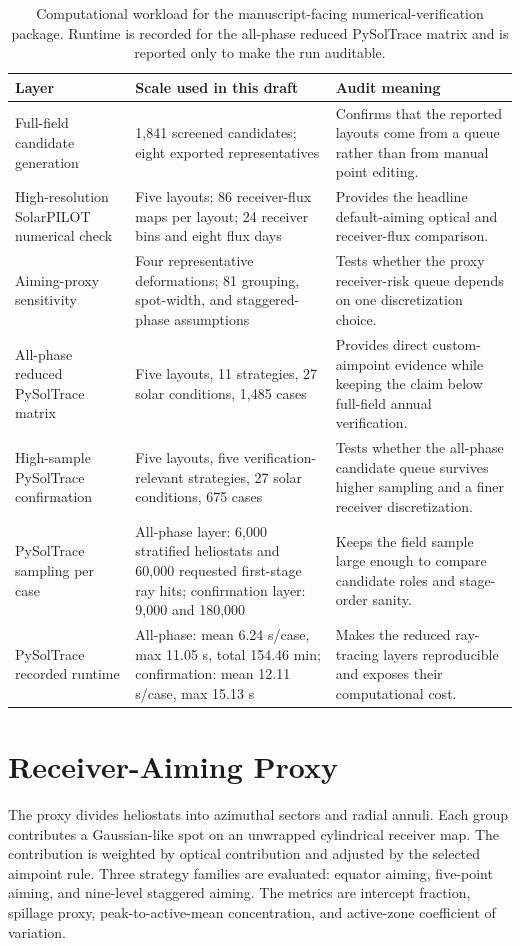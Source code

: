 \documentclass[final,3p,times]{elsarticle}
\begin{document}
\begin{table}[t]
\centering
\caption{Computational workload for the manuscript-facing numerical-verification package. Runtime is recorded for the all-phase reduced PySolTrace matrix and is reported only to make the run auditable.}
\label{tab:workload}
\scriptsize
\begin{tabular}{p{}p{}p{}}
\toprule
Layer & Scale used in this draft & Audit meaning \\
\midrule
Full-field candidate generation & 1,841 screened candidates; eight exported representatives & Confirms that the reported layouts come from a queue rather than from manual point editing. \\
High-resolution SolarPILOT numerical check & Five layouts; 86 receiver-flux maps per layout; 24 receiver bins and eight flux days & Provides the headline default-aiming optical and receiver-flux comparison. \\
Aiming-proxy sensitivity & Four representative deformations; 81 grouping, spot-width, and staggered-phase assumptions & Tests whether the proxy receiver-risk queue depends on one discretization choice. \\
All-phase reduced PySolTrace matrix & Five layouts, 11 strategies, 27 solar conditions, 1,485 cases & Provides direct custom-aimpoint evidence while keeping the claim below full-field annual verification. \\
High-sample PySolTrace confirmation & Five layouts, five verification-relevant strategies, 27 solar conditions, 675 cases & Tests whether the all-phase candidate queue survives higher sampling and a finer receiver discretization. \\
PySolTrace sampling per case & All-phase layer: 6,000 stratified heliostats and 60,000 requested first-stage ray hits; confirmation layer: 9,000 and 180,000 & Keeps the field sample large enough to compare candidate roles and stage-order sanity. \\
PySolTrace recorded runtime & All-phase: mean 6.24 s/case, max 11.05 s, total 154.46 min; confirmation: mean 12.11 s/case, max 15.13 s & Makes the reduced ray-tracing layers reproducible and exposes their computational cost. \\
\bottomrule
\end{tabular}
\end{table}

\section{Receiver-Aiming Proxy}
The proxy divides heliostats into azimuthal sectors and radial annuli. Each group contributes a Gaussian-like spot on an unwrapped cylindrical receiver map. The contribution is weighted by optical contribution and adjusted by the selected aimpoint rule. Three strategy families are evaluated: equator aiming, five-point aiming, and nine-level staggered aiming. The metrics are intercept fraction, spillage proxy, peak-to-active-mean concentration, and active-zone coefficient of variation.
\end{document}
